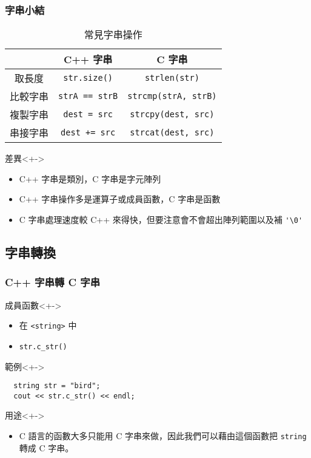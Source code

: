 \documentclass[utf8]{beamer}
\begin{document}
\begin{CJK}{UTF8}{bkai}
\begin{frame}[fragile]
  \frametitle{字串小結}
  \begin{table}[h]
    \caption{常見字串操作}
    \begin{tabular}{c|c|c}
            & C++ 字串                   & C 字串\onslide<+->\\
    \hline\hline
    取長度   & \lstinline{str.size()}{}  & \lstinline{strlen(str)}{}\onslide<+->\\
    \hline
    比較字串 & \lstinline{strA == strB}{} & \lstinline{strcmp(strA, strB)}{}\onslide<+->\\
    \hline
    複製字串 & \lstinline{dest = src}{}   & \lstinline{strcpy(dest, src)}{}\onslide<+->\\
    \hline
    串接字串 & \lstinline{dest += src}{}  & \lstinline{strcat(dest, src)}{}
    \end{tabular}
  \end{table}
  \begin{exampleblock}{差異}<+->
    \begin{itemize}[<+->]
    \item C++ 字串是\alert{類別}，C 字串是\alert{字元陣列}
    \item C++ 字串操作多是\alert{運算子}或\alert{成員函數}，C 字串是\alert{函數}
    \item C 字串處理速度較 C++ 來得\alert{快}，但要注意會不會超出\alert{陣列範圍}以及補 \lstinline{'\0'}{}
    \end{itemize}
  \end{exampleblock}
\end{frame}

\subsection{字串轉換}

\begin{frame}[fragile]
  \frametitle{C++ 字串轉 C 字串}
  \begin{block}{成員函數}<+->
    \begin{itemize}
    \item 在 \lstinline{<string>}{} 中
    \item<+-> \lstinline{str.c_str()}{}
    \end{itemize}
  \end{block}
  \begin{exampleblock}{範例}<+->
    \begin{lstlisting}
  string str = "bird";
  cout << str.c_str() << endl;
    \end{lstlisting}
  \end{exampleblock}
  \begin{alertblock}{用途}<+->
    \begin{itemize}
    \item C 語言的函數大多只能用 C 字串來做，因此我們可以藉由這個函數把 \lstinline{string}{} 轉成 C 字串。
    \end{itemize}
  \end{alertblock}
\end{frame}


\end{CJK}
\end{document}
